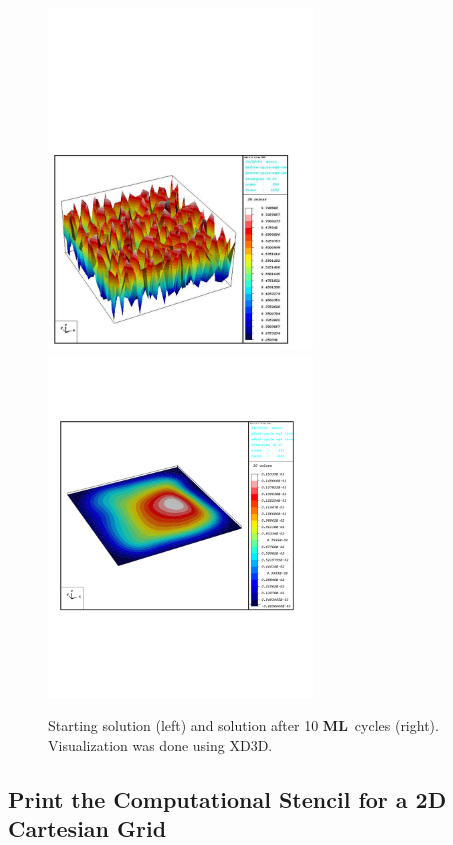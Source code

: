 \documentclass{article}[11pt]
\newcommand{\ML}     {{\bf ML}}
\begin{document}
\begin{figure}[ht]
\centering
\includegraphics[width=7cm]{before_cycle} \hspace{0.5cm}
\includegraphics[width=7cm]{after_cycle}
\caption{Starting solution (left) and solution after 10 \ML~cycles (right).
Visualization was done using XD3D.}
\label{fig:viz:cycle}
\end{figure}


\subsection{Print the Computational Stencil for a 2D Cartesian Grid}
\end{document}
